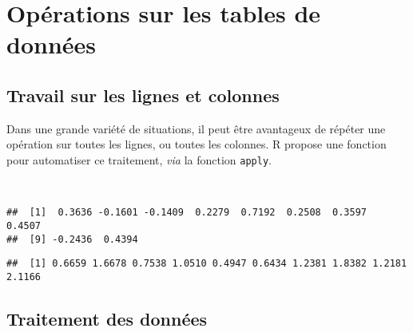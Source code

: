 \chapter{Opérations sur les tables de données\label{c:tables}}

\section{Travail sur les lignes et colonnes}

Dans une grande variété de situations, il peut être avantageux de répéter une opération sur toutes les lignes, ou toutes les colonnes.
R propose une fonction pour automatiser ce traitement, \emph{via} la fonction \texttt{apply}. 

\begin{knitrout}
\color{fgcolor}\begin{kframe}
\begin{flushleft}
\ttfamily\noindent
{}\hlassignement{\usebox{\hlnormalsizeboxlessthan}-}{\ }\hlkeyword{(}\hlkeyword{(}\hlkeyword{)}\hlkeyword{,}{\ }\hlargument{=}{\ }\hlkeyword{)}\hspace*{\fill}\\
\hlstd{}\hlkeyword{(}\hlkeyword{,}{\ }\hlkeyword{,}{\ }\hlkeyword{)}\mbox{}
\normalfont
\end{flushleft}
\begin{verbatim}
##  [1]  0.3636 -0.1601 -0.1409  0.2279  0.7192  0.2508  0.3597  0.4507
##  [9] -0.2436  0.4394
\end{verbatim}
\begin{flushleft}
\ttfamily\noindent
{}\hlkeyword{(}\hlkeyword{,}{\ }\hlkeyword{,}{\ }\hlkeyword{)}\mbox{}
\normalfont
\end{flushleft}
\begin{verbatim}
##  [1] 0.6659 1.6678 0.7538 1.0510 0.4947 0.6434 1.2381 1.8382 1.2181 2.1166
\end{verbatim}
\end{kframe}
\end{knitrout}


\section{Traitement des données}

